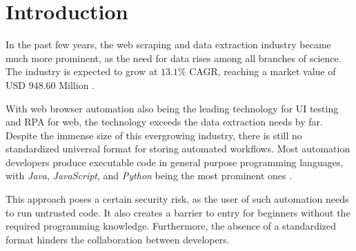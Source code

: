\chapter*{Introduction} \label{intro}


In the past few years, the web scraping and data extraction industry became much more prominent, as the need for data rises among all branches of science. 
The industry is expected to grow at $13.1\%$ CAGR, reaching a market value of USD $948.60$ Million .
\par
With web browser automation also being the leading technology for UI testing and \ac{RPA} for web, the technology exceeds the data extraction needs by far.
Despite the immense size of this evergrowing industry, there is still no standardized universal format for storing automated workflows. 
Most automation developers produce executable code in general purpose programming languages, with \textit{Java}, \textit{JavaScript}, and \textit{Python} being the most prominent ones .
\par
This approach poses a certain security risk, as the user of such automation needs to run untrusted code. 
It also creates a barrier to entry for beginners without the required programming knowledge. 
Furthermore, the absence of a standardized format hinders the collaboration between developers.

